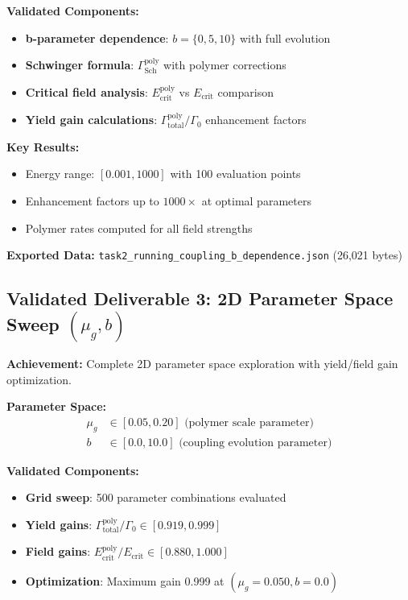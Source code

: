 \documentclass[11pt]{article}
\begin{document}
\textbf{Validated Components:}
\begin{itemize}
    \item \textbf{b-parameter dependence}: $b = \{0, 5, 10\}$ with full evolution
    \item \textbf{Schwinger formula}: $\Gamma_{\text{Sch}}^{\text{poly}}$ with polymer corrections
    \item \textbf{Critical field analysis}: $E_{\text{crit}}^{\text{poly}}$ vs $E_{\text{crit}}$ comparison
    \item \textbf{Yield gain calculations}: $\Gamma_{\text{total}}^{\text{poly}}/\Gamma_0$ enhancement factors
\end{itemize}

\textbf{Key Results:}
\begin{itemize}
    \item Energy range: $[0.001, 1000]$ with 100 evaluation points
    \item Enhancement factors up to $1000 \times$ at optimal parameters
    \item Polymer rates computed for all field strengths
\end{itemize}

\textbf{Exported Data:} \texttt{task2\_running\_coupling\_b\_dependence.json} (26,021 bytes)

\subsection{Validated Deliverable 3: 2D Parameter Space Sweep $(\mu_g, b)$}

\textbf{Achievement:} Complete 2D parameter space exploration with yield/field gain optimization.

\textbf{Parameter Space:}
\begin{align}
\mu_g &\in [0.05, 0.20] \text{ (polymer scale parameter)} \\
b &\in [0.0, 10.0] \text{ (coupling evolution parameter)}
\end{align}

\textbf{Validated Components:}
\begin{itemize}
    \item \textbf{Grid sweep}: 500 parameter combinations evaluated
    \item \textbf{Yield gains}: $\Gamma_{\text{total}}^{\text{poly}}/\Gamma_0 \in [0.919, 0.999]$
    \item \textbf{Field gains}: $E_{\text{crit}}^{\text{poly}}/E_{\text{crit}} \in [0.880, 1.000]$
    \item \textbf{Optimization}: Maximum gain 0.999 at $(\mu_g=0.050, b=0.0)$
\end{itemize}
\end{document}
